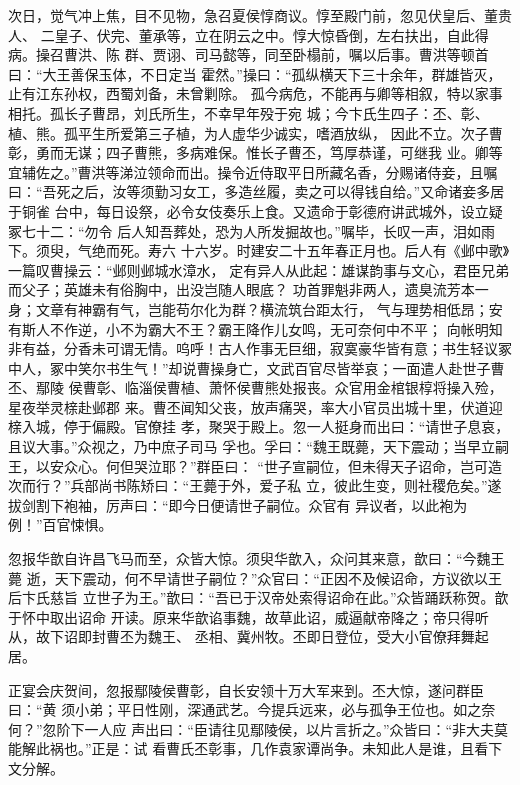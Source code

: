次日，觉气冲上焦，目不见物，急召夏侯惇商议。惇至殿门前，忽见伏皇后、董贵人、
二皇子、伏完、董承等，立在阴云之中。惇大惊昏倒，左右扶出，自此得病。操召曹洪、陈
群、贾诩、司马懿等，同至卧榻前，嘱以后事。曹洪等顿首曰：“大王善保玉体，不日定当
霍然。”操曰：“孤纵横天下三十余年，群雄皆灭，止有江东孙权，西蜀刘备，未曾剿除。
孤今病危，不能再与卿等相叙，特以家事相托。孤长子曹昂，刘氏所生，不幸早年殁于宛
城；今卞氏生四子：丕、彰、植、熊。孤平生所爱第三子植，为人虚华少诚实，嗜酒放纵，
因此不立。次子曹彰，勇而无谋；四子曹熊，多病难保。惟长子曹丕，笃厚恭谨，可继我
业。卿等宜辅佐之。”曹洪等涕泣领命而出。操令近侍取平日所藏名香，分赐诸侍妾，且嘱
曰：“吾死之后，汝等须勤习女工，多造丝履，卖之可以得钱自给。”又命诸妾多居于铜雀
台中，每日设祭，必令女伎奏乐上食。又遗命于彰德府讲武城外，设立疑冢七十二：“勿令
后人知吾葬处，恐为人所发掘故也。”嘱毕，长叹一声，泪如雨下。须臾，气绝而死。寿六
十六岁。时建安二十五年春正月也。后人有《邺中歌》一篇叹曹操云：“邺则邺城水漳水，
定有异人从此起：雄谋韵事与文心，君臣兄弟而父子；英雄未有俗胸中，出没岂随人眼底？
功首罪魁非两人，遗臭流芳本一身；文章有神霸有气，岂能苟尔化为群？横流筑台距太行，
气与理势相低昂；安有斯人不作逆，小不为霸大不王？霸王降作儿女鸣，无可奈何中不平；
向帐明知非有益，分香未可谓无情。呜呼！古人作事无巨细，寂寞豪华皆有意；书生轻议冢
中人，冢中笑尔书生气！”却说曹操身亡，文武百官尽皆举哀；一面遣人赴世子曹丕、鄢陵
侯曹彰、临淄侯曹植、萧怀侯曹熊处报丧。众官用金棺银椁将操入殓，星夜举灵榇赴邺郡
来。曹丕闻知父丧，放声痛哭，率大小官员出城十里，伏道迎榇入城，停于偏殿。官僚挂
孝，聚哭于殿上。忽一人挺身而出曰：“请世子息哀，且议大事。”众视之，乃中庶子司马
孚也。孚曰：“魏王既薨，天下震动；当早立嗣王，以安众心。何但哭泣耶？”群臣曰：
“世子宣嗣位，但未得天子诏命，岂可造次而行？”兵部尚书陈矫曰：“王薨于外，爱子私
立，彼此生变，则社稷危矣。”遂拔剑割下袍袖，厉声曰：“即今日便请世子嗣位。众官有
异议者，以此袍为例！”百官悚惧。

忽报华歆自许昌飞马而至，众皆大惊。须臾华歆入，众问其来意，歆曰：“今魏王薨
逝，天下震动，何不早请世子嗣位？”众官曰：“正因不及候诏命，方议欲以王后卞氏慈旨
立世子为王。”歆曰：“吾已于汉帝处索得诏命在此。”众皆踊跃称贺。歆于怀中取出诏命
开读。原来华歆谄事魏，故草此诏，威逼献帝降之；帝只得听从，故下诏即封曹丕为魏王、
丞相、冀州牧。丕即日登位，受大小官僚拜舞起居。

正宴会庆贺间，忽报鄢陵侯曹彰，自长安领十万大军来到。丕大惊，遂问群臣曰：“黄
须小弟；平日性刚，深通武艺。今提兵远来，必与孤争王位也。如之奈何？”忽阶下一人应
声出曰：“臣请往见鄢陵侯，以片言折之。”众皆曰：“非大夫莫能解此祸也。”正是：试
看曹氏丕彰事，几作袁家谭尚争。未知此人是谁，且看下文分解。